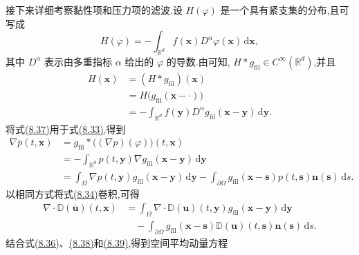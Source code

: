 \begin{note}
接下来详细考察黏性项和压力项的滤波.设 $H(\varphi)$ 是一个具有紧支集的分布,且可写成
\[
 H(\varphi)
  =-\int_{\mathbb{R}^d}
      f(\bm{x})D^\alpha\varphi(\bm{x})
      \,\mathrm{d}\bm{x},
\]
其中 $D^\alpha$ 表示由多重指标 $\alpha$ 给出的 $\varphi$ 的导数.由\textcite[Theorem~6.35]{Rudin1991}可知,
$H*g_{\mathrm{fil}}\in C^\infty(\mathbb{R}^d)$,并且
\begin{equation}\label{eq:distribution-convolution-representation}
\begin{aligned}
 H(\bm{x})
  &=(H*g_{\mathrm{fil}})(\bm{x})\\
  &=H\bigl(g_{\mathrm{fil}}(\bm{x}-\cdot)\bigr)\\
  &=-\int_{\mathbb{R}^d}
      f(\bm{y})D^\alpha
        g_{\mathrm{fil}}(\bm{x}-\bm{y})
      \,\mathrm{d}\bm{y}.
\end{aligned}
\end{equation}
将式\hyperref[eq:distribution-convolution-representation]{(8.37)}用于式\hyperref[eq:distributional-pressure-gradient]{(8.33)},得到
\begin{equation}\label{eq:filtered-pressure-gradient-bounded-domain}
\begin{aligned}
 \nabla\overline{p}(t,\bm{x})
  &=g_{\mathrm{fil}}*
       \bigl((\nabla p)(\varphi)\bigr)(t,\bm{x})\\
  &=-\int_{\mathbb{R}^d}
       p(t,\bm{y})\nabla
       g_{\mathrm{fil}}(\bm{x}-\bm{y})
       \,\mathrm{d}\bm{y}\\
  &=\int_\Omega
       \nabla p(t,\bm{y})g_{\mathrm{fil}}(\bm{x}-\bm{y})
       \,\mathrm{d}\bm{y}
    -\int_{\partial\Omega}
       g_{\mathrm{fil}}(\bm{x}-\bm{s})p(t,\bm{s})
       \bm{n}(\bm{s})\,\mathrm{d}s.
\end{aligned}
\end{equation}
以相同方式将式\hyperref[eq:distributional-viscous-divergence]{(8.34)}卷积,可得
\begin{equation}\label{eq:filtered-viscous-divergence-bounded-domain}
\begin{aligned}
 \nabla\cdot\mathbb{D}(\overline{\bm{u}})(t,\bm{x})
  &=\int_\Omega
       \nabla\cdot\mathbb{D}(\bm{u})(t,\bm{y})
       g_{\mathrm{fil}}(\bm{x}-\bm{y})\,\mathrm{d}\bm{y}\\
  &\quad
    -\int_{\partial\Omega}
       g_{\mathrm{fil}}(\bm{x}-\bm{s})
       \mathbb{D}(\bm{u})(t,\bm{s})
       \bm{n}(\bm{s})\,\mathrm{d}s.
\end{aligned}
\end{equation}
结合式\hyperref[eq:filtered-distributional-momentum-left]{(8.36)}、\hyperref[eq:filtered-pressure-gradient-bounded-domain]{(8.38)}和\hyperref[eq:filtered-viscous-divergence-bounded-domain]{(8.39)},得到空间平均动量方程

\end{note}
